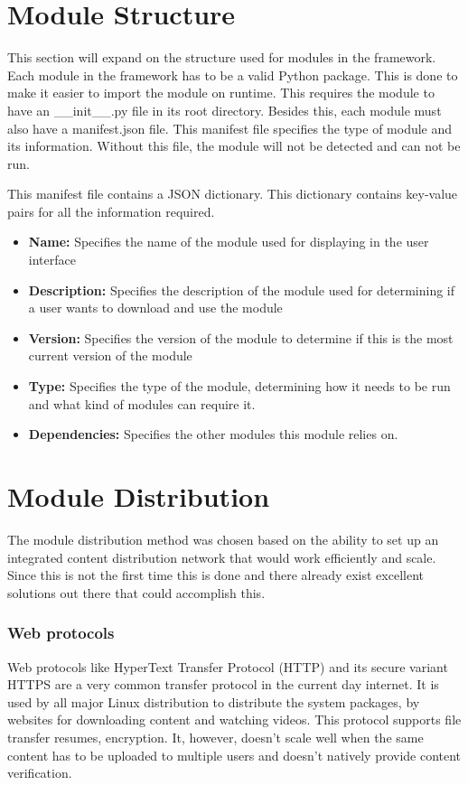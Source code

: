\section{Module Structure}

This section will expand on the structure used for modules in the framework. Each module in the framework has to be a valid Python package. This is done to make it easier to import the module on runtime. This requires the module to have an \_\_init\_\_.py file in its root directory. Besides this, each module must also have a manifest.json file. This manifest file specifies the type of module and its information. Without this file, the module will not be detected and can not be run.

This manifest file contains a JSON dictionary. This dictionary contains key-value pairs for all the information required.

\begin{itemize}
	\item \textbf{Name:} Specifies the name of the module used for displaying in the user interface
	\item \textbf{Description:} Specifies the description of the module used for determining if a user wants to download and use the module 
	\item \textbf{Version:} Specifies the version of the module to determine if this is the most current version of the module
	\item \textbf{Type:} Specifies the type of the module, determining how it needs to be run and what kind of modules can require it.
	\item \textbf{Dependencies:} Specifies the other modules this module relies on.
\end{itemize}


\section{Module Distribution}
The module distribution method was chosen based on the ability to set up an integrated content distribution network that would work efficiently and scale. Since this is not the first time this is done and there already exist excellent solutions out there that could accomplish this.

\subsubsection{\textbf{Web protocols}}

Web protocols like HyperText Transfer Protocol (HTTP) and its secure variant HTTPS are a very common transfer protocol in the current day internet. It is used by all major Linux distribution to distribute the system packages, by websites for downloading content and watching videos. This protocol supports file transfer resumes, encryption. It, however, doesn't scale well when the same content has to be uploaded to multiple users and doesn't natively provide content verification.

